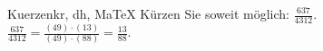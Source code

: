 \begin{MAufgabe}{Kuerzen}{kr, dh, MaTeX}
K\"urzen Sie soweit m\"oglich: $\frac{637}{4312}$.\\ 
\ifLsg\MLoesung
\quad $\frac{637}{4312}=\frac{(49)\cdot(13)}{(49)\cdot(88)}=\frac{13}{88}$.\else\relax\fi
 \end{MAufgabe}
